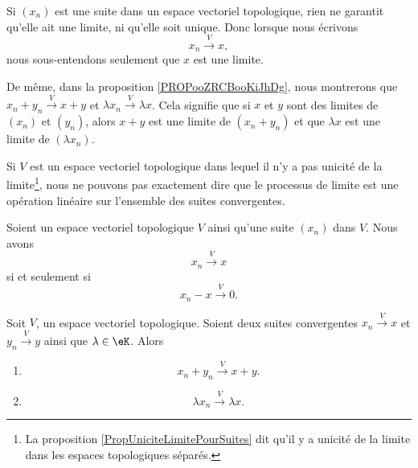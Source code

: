 Si \( (x_n)\) est une suite dans un espace vectoriel topologique, rien ne garantit qu'elle ait une limite, ni qu'elle soit unique. Donc lorsque nous écrivons
\begin{equation}
    x_n\stackrel{V}{\longrightarrow}x,
\end{equation}
nous sous-entendons seulement que \( x\) est une limite.

De même, dans la proposition \ref{PROPooZRCBooKiJhDg}, nous montrerons que \( x_n+y_n\stackrel{V}{\longrightarrow}x+y\) et \( \lambda x_n\stackrel{ V}{\longrightarrow}\lambda x\). Cela signifie que si \( x\) et \( y\) sont des limites de \( (x_n)\) et \( (y_n)\), alors \( x+y\) est une limite de \( (x_n+y_n)\) et que \( \lambda x\) est une limite de \( (\lambda x_n)\).

Si \( V\) est un espace vectoriel topologique dans lequel il n'y a pas unicité de la limite\footnote{La proposition \ref{PropUniciteLimitePourSuites} dit qu'il y a unicité de la limite dans les espaces topologiques séparés.}, nous ne pouvons pas exactement dire que le processus de limite est une opération linéaire sur l'ensemble des suites convergentes.

\begin{lemma}       \label{LEMooJDJVooHUKdSe}
    Soient un espace vectoriel topologique \( V\) ainsi qu'une suite \( (x_n)\) dans \( V\). Nous avons
    \begin{equation}
        x_n\stackrel{V}{\longrightarrow}x 
    \end{equation}
    si et seulement si
    \begin{equation}
        x_n-x\stackrel{V}{\longrightarrow}0.
    \end{equation}
\end{lemma}

\begin{proposition}        \label{PROPooZRCBooKiJhDg}
    Soit \( V\), un espace vectoriel topologique. Soient deux suites convergentes \( x_n\stackrel{V}{\longrightarrow}x\) et \( y_n\stackrel{V}{\longrightarrow}y\) ainsi que \( \lambda\in \eK\). Alors
    \begin{enumerate}
        \item       \label{ITEMooSHPAooQyEkgT}
    \begin{equation}
        x_n+y_n\stackrel{V}{\longrightarrow}x+y.
    \end{equation}
\item   \label{ITEMooYHHYooYATzWE}
    \begin{equation}
        \lambda x_n\stackrel{V}{\longrightarrow}\lambda x.
    \end{equation}
    \end{enumerate}
\end{proposition}

